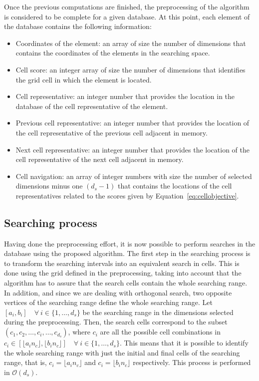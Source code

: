 \documentclass[preprint,12pt]{elsarticle}
\begin{document}
Once the previous computations are finished, the preprocessing of the algorithm is considered to be complete for a given database. At this point, each element of the database contains the following information:
\begin{itemize}
	\item Coordinates of the element: an array of size the number of dimensions that contains the coordinates of the elements in the searching space.
	\item Cell score: an integer array of size the number of dimensions that identifies the grid cell in which the element is located.
	\item Cell representative: an integer number that provides the location in the database of the cell representative of the element. 
	\item Previous cell representative: an integer number that provides the location of the cell representative of the previous cell adjacent in memory.
	\item Next cell representative: an integer number that provides the location of the cell representative of the next cell adjacent in memory.
	\item Cell navigation: an array of integer numbers with size the number of selected dimensions minus one $(d_s - 1)$ that contains the locations of the cell representatives related to the scores given by Equation~\eqref{eq:cellobjective}.
\end{itemize} 


\subsection{Searching process}
\label{sec:search}

Having done the preprocessing effort, it is now possible to perform searches in the database using the proposed algorithm. The first step in the searching process is to transform the searching intervals into an equivalent search in cells. This is done using the grid defined in the preprocessing, taking into account that the algorithm has to assure that the search cells contain the whole searching range. In addition, and since we are dealing with orthogonal search, two opposite vertices of the searching range define the whole searching range. Let $[a_i, b_i] \quad \forall \: i\in\{1, \dots, d_s\}$ be the searching range in the dimensions selected during the preprocessing. Then, the search cells correspond to the subset $(c_1,c_2,\dots,c_i,\dots,c_{d_s})$, where $c_i$ are all the possible cell combinations in $c_i \in [\lfloor a_in_c \rfloor, \lfloor b_in_c \rfloor] \quad \forall \: i \in \{1,\dots,d_s\}$. This means that it is possible to identify the whole searching range with just the initial and final cells of the searching range, that is, $c_i = \lfloor a_in_c \rfloor$ and $c_i = \lfloor b_in_c \rfloor$ respectively. This process is performed in $\mathcal{O}(d_s)$.
\end{document}
